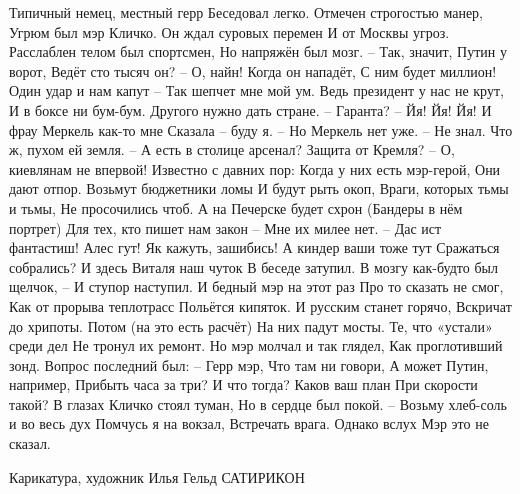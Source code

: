 \begin{multicols}{3} %
Типичный немец, местный герр
Беседовал легко.
Отмечен строгостью манер,
Угрюм был мэр Кличко.
\smallskip
Он ждал суровых перемен
И от Москвы угроз.
Расслаблен телом был спортсмен,
Но напряжён был мозг.
\smallskip
– Так, значит, Путин у ворот,
Ведёт сто тысяч он?
– О, найн! Когда он нападёт,
С ним будет миллион!
\smallskip
Один удар и нам капут – 
Так шепчет мне мой ум.
Ведь президент у нас не крут,
И в боксе ни бум-бум.
\smallskip
Другого нужно дать стране.
– Гаранта? – Йя! Йя! Йя!
И фрау Меркель как-то мне
Сказала – буду я.
\smallskip
– Но Меркель нет уже. – Не знал.
Что ж, пухом ей земля.
– А есть в столице арсенал?
Защита от Кремля?
\smallskip
– О, киевлянам не впервой!
Известно с давних пор:
Когда у них есть мэр-герой,
Они дают отпор.
\smallskip
Возьмут бюджетники ломы
И будут рыть окоп,
Враги, которых тьмы и тьмы,
Не просочились чтоб.
\smallskip
А на Печерске будет схрон
(Бандеры в нём портрет)
Для тех, кто пишет нам закон – 
Мне их милее нет.
\smallskip
– Дас ист фантастиш! Алес гут!
Як кажуть, зашибись!
А киндер ваши тоже тут
Сражаться собрались? 
\smallskip
И здесь Виталя наш чуток
В беседе затупил.
В мозгу как-будто был щелчок, –
И ступор наступил.
\smallskip
И бедный мэр на этот раз
Про то сказать не смог,
Как от прорыва теплотрасс
Польётся кипяток.
\smallskip
И русским станет горячо,
Вскричат до хрипоты.
Потом (на это есть расчёт)
На них падут мосты.
\smallskip
Те, что «устали» среди дел
Не тронул их ремонт.
Но мэр молчал и так глядел,
Как проглотивший зонд.
\smallskip
Вопрос последний был: – Герр мэр,
Что там ни говори,
А может Путин, например,
Прибыть часа за три?
\smallskip
И что тогда? Каков ваш план
При скорости такой?
В глазах Кличко стоял туман,
Но в сердце был покой.
\smallskip
– Возьму хлеб-соль и во весь дух
Помчусь я на вокзал,
Встречать врага. Однако вслух
Мэр это не сказал.
\end{multicols} %

Карикатура, художник Илья Гельд
САТИРИКОН
